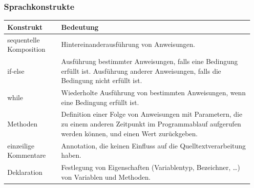 \documentclass[a4paper,10pt]{article}
\begin{document}
\subsubsection{Sprachkonstrukte}
\begin{tabularx}{\textwidth}{| l | X |}
\hline
\textbf{Konstrukt} & \textbf{Bedeutung}\\
\hline
sequentelle Komposition & Hintereinanderausf\"{u}hrung von Anweisungen.\\
\hline
if-else & Ausf\"{u}hrung bestimmter Anweisungen, falls eine Bedingung erf\"{u}llt ist. Ausf\"{u}hrung anderer Anweisungen, falls die Bedingung nicht erf\"{u}llt ist.\\
\hline
while & Wiederholte Ausf\"{u}hrung von bestimmten Anweisungen, wenn eine Bedingung erf\"{u}llt ist.\\
\hline
Methoden & Definition einer Folge von Anweisungen mit Parametern, die zu einem anderen Zeitpunkt im Programmablauf aufgerufen werden k\"{o}nnen, und einen Wert zur\"{u}ckgeben.\\
\hline
einzeilige Kommentare & Annotation, die keinen Einfluss auf die Quelltextverarbeitung haben.\\
\hline
Deklaration & Festlegung von Eigenschaften (Variablentyp, Bezeichner, \ldots) von Variablen und Methoden.\\
\hline
\end{tabularx}
\end{document}
